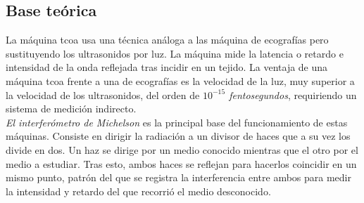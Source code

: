 \subsection{Base teórica}
La máquina \gls{tcoa} usa una técnica análoga a las máquina de
ecografías pero sustituyendo los ultrasonidos por luz. La máquina mide
la latencia o retardo e intensidad de la onda reflejada tras incidir
en un tejido. La ventaja de una máquina \gls{tcoa} frente a una de
ecografías es la velocidad de la luz, muy superior a la velocidad de
los ultrasonidos, del orden de \emph{$10^{-15}$ fentosegundos}, requiriendo un sistema de medición indirecto.\\
\emph{El interferómetro de Michelson} es la principal base del
funcionamiento de estas máquinas. Consiste en dirigir la radiación a
un divisor de haces que a su vez los divide en dos. Un haz se dirige
por un medio conocido mientras que el otro por el medio a
estudiar. Tras esto, ambos haces se reflejan para hacerlos coincidir
en un mismo punto, patrón del que se registra la interferencia entre
ambos para medir la intensidad y retardo del que recorrió el medio
desconocido.

